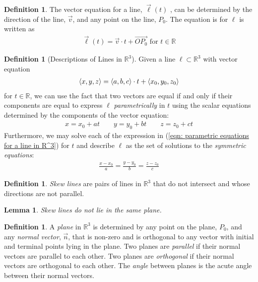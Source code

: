 \documentclass{article}[11pt]
\newtheorem{lemma}[theorem]{Lemma}
\theoremstyle{definition}
\newtheorem{definition}[theorem]{Definition}
\DeclarePairedDelimiter\vecvec{\langle}{\rangle}
\numberwithin{equation}{section}
\begin{document}
\begin{definition}
	The vector equation for a line, \( \vec{\ell}(t) \) , can be determined by the direction of the line, \(\vec{v}\), and any point on the line, \(P_0\). The equation is for \(\ell\) is written as
	\begin{align*}
		\vec{\ell}(t)=\vec{v}\cdot t +\overrightarrow{OP_0} \text{ for }t\in\mathbb{R}
	\end{align*}
\end{definition}

\begin{definition}[Descriptions of Lines in \(\mathbb{R}^3\)]
	Given a line \(\ell \subset \mathbb{R}^3 \) with vector equation
	\begin{align}
		\vecvec{x,y,z}=\vecvec{a,b,c}\cdot t + \vecvec{x_0,y_0,z_0}
	\end{align}
	for \(t\in\mathbb{R}\), we can use the fact that two vectors are equal if and only if their components are equal to express \(\ell\) \emph{parametrically} in \(t\) using the scalar equations determined by the components of the vector equation:
	\begin{align}
		x=x_0+at \quad\quad y=y_0+bt \quad\quad z=z_0+ct \label{eqn: parametric equations for a line in R^3}
	\end{align}
	Furthermore, we may solve each of the expression in (\ref{eqn: parametric equations for a line in R^3}) for \(t\) and describe \(\ell\) as the set of solutions to the \emph{symmetric equations}:
	\begin{align}
		\frac{x-x_0}{a}=\frac{y-y_0}{b}=\frac{z-z_0}{c}
	\end{align}
\end{definition}

\begin{definition}
	\emph{Skew lines} are pairs of lines in \(\mathbb{R}^3\) that do not intersect and whose directions are not parallel.
\end{definition}

\begin{lemma}
	Skew lines do not lie in the same plane.
\end{lemma}

\begin{definition}
	A \emph{plane} in \(\mathbb{R}^3\) is determined by any point on the plane, \(P_0\), and any \emph{normal vector}, \(\vec{n}\), that is non-zero and is orthogonal to any vector with initial and terminal points lying in the plane. Two planes are \emph{parallel} if their normal vectors are parallel to each other. Two planes are \emph{orthogonal} if their normal vectors are orthogonal to each other. The \emph{angle} between planes is the acute angle between their normal vectors.
\end{definition}
\end{document}
